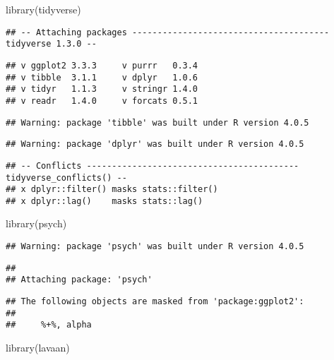 \documentclass[
]{article}
\newenvironment{Shaded}{\begin{snugshade}}{\end{snugshade}}
\newcommand{\FunctionTok}[1]{\textcolor[rgb]{0.00,0.00,0.00}{#1}}
\newcommand{\NormalTok}[1]{#1}
\begin{document}
\begin{Shaded}
\begin{Highlighting}[]
\FunctionTok{library}\NormalTok{(tidyverse)}
\end{Highlighting}
\end{Shaded}

\begin{verbatim}
## -- Attaching packages --------------------------------------- tidyverse 1.3.0 --
\end{verbatim}

\begin{verbatim}
## v ggplot2 3.3.3     v purrr   0.3.4
## v tibble  3.1.1     v dplyr   1.0.6
## v tidyr   1.1.3     v stringr 1.4.0
## v readr   1.4.0     v forcats 0.5.1
\end{verbatim}

\begin{verbatim}
## Warning: package 'tibble' was built under R version 4.0.5
\end{verbatim}

\begin{verbatim}
## Warning: package 'dplyr' was built under R version 4.0.5
\end{verbatim}

\begin{verbatim}
## -- Conflicts ------------------------------------------ tidyverse_conflicts() --
## x dplyr::filter() masks stats::filter()
## x dplyr::lag()    masks stats::lag()
\end{verbatim}

\begin{Shaded}
\begin{Highlighting}[]
\FunctionTok{library}\NormalTok{(psych)}
\end{Highlighting}
\end{Shaded}

\begin{verbatim}
## Warning: package 'psych' was built under R version 4.0.5
\end{verbatim}

\begin{verbatim}
## 
## Attaching package: 'psych'
\end{verbatim}

\begin{verbatim}
## The following objects are masked from 'package:ggplot2':
## 
##     %+%, alpha
\end{verbatim}

\begin{Shaded}
\begin{Highlighting}[]
\FunctionTok{library}\NormalTok{(lavaan)}
\end{Highlighting}
\end{Shaded}
\end{document}
